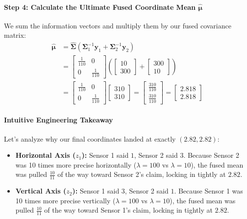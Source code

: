 \documentclass{article}
\begin{document}
\paragraph{Step 4: Calculate the Ultimate Fused Coordinate Mean $\hat{\boldsymbol{\mu}}$}
We sum the information vectors and multiply them by our fused covariance matrix:
\begin{align}
\hat{\boldsymbol{\mu}} &= \hat{\boldsymbol{\Sigma}} \left( \boldsymbol{\Sigma}_1^{-1}\mathbf{y}_1 + \boldsymbol{\Sigma}_2^{-1}\mathbf{y}_2 \right) \nonumber \\
&= \begin{bmatrix} \frac{1}{110} & 0 \\ 0 & \frac{1}{110} \end{bmatrix} \left( \begin{bmatrix} 10 \\ 300 \end{bmatrix} + \begin{bmatrix} 300 \\ 10 \end{bmatrix} \right) \nonumber \\
&= \begin{bmatrix} \frac{1}{110} & 0 \\ 0 & \frac{1}{110} \end{bmatrix} \begin{bmatrix} 310 \\ 310 \end{bmatrix} = \begin{bmatrix} \frac{310}{110} \\ \frac{310}{110} \end{bmatrix} = \begin{bmatrix} 2.818 \\ 2.818 \end{bmatrix} \tag{75}
\end{align}

\paragraph{Intuitive Engineering Takeaway}
Let's analyze why our final coordinates landed at exactly $(2.82, 2.82)$:
\begin{itemize}
    \item \textbf{Horizontal Axis ($z_1$):} Sensor 1 said $1$, Sensor 2 said $3$. Because Sensor 2 was 10 times more precise horizontally ($\lambda=100$ vs $\lambda=10$), the fused mean was pulled $\frac{10}{11}$ of the way toward Sensor 2's claim, locking in tightly at $2.82$.
    \item \textbf{Vertical Axis ($z_2$):} Sensor 1 said $3$, Sensor 2 said $1$. Because Sensor 1 was 10 times more precise vertically ($\lambda=100$ vs $\lambda=10$), the fused mean was pulled $\frac{10}{11}$ of the way toward Sensor 1's claim, locking in tightly at $2.82$.
\end{itemize}
\end{document}
